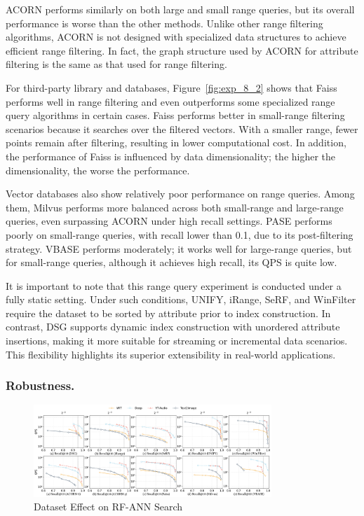 \documentclass[sigconf, nonacm]{acmart}
\begin{document}
	ACORN performs similarly on both large and small range queries, but its overall performance is worse than the other methods. Unlike other range filtering algorithms, ACORN is not designed with specialized data structures  to achieve efficient range filtering. In fact, the graph structure used by ACORN for attribute filtering is the same as that used for range filtering.
	
	For third-party library and databases, Figure~\ref{fig:exp_8_2} shows that Faiss performs well in range filtering and even outperforms some specialized range query algorithms in certain cases. 
	Faiss performs better in small-range filtering scenarios because it searches over the filtered vectors. With a smaller range, fewer points remain after filtering, resulting in lower computational cost. In addition, the performance of Faiss is influenced by data dimensionality; the higher the dimensionality, the worse the performance.
	
	Vector databases also show relatively poor performance on range queries. Among them, Milvus performs more balanced across both small-range and large-range queries, even surpassing ACORN under high recall settings. PASE performs poorly on small-range queries, with recall lower than 0.1, due to its post-filtering strategy. 
	VBASE performs moderately; it works well for large-range queries, but for small-range queries, although it achieves high recall, its QPS is quite  low.
	
	
	
	It is important to note that this range query experiment is conducted under a fully static setting. Under such conditions, UNIFY, iRange, SeRF, and WinFilter require the dataset to be sorted by attribute prior to index construction. In contrast, DSG  supports dynamic index construction with unordered attribute insertions, making it more suitable for streaming or incremental data scenarios. This flexibility highlights its superior extensibility in real-world applications.
	\subsubsection{Robustness.}
	
	
	\begin{figure}[htbp]
		\centering
		\includegraphics[width=0.80\textwidth]{figures/exp/exp_8_3.pdf}
		\caption{Dataset Effect on RF-ANN Search}
		\label{fig:exp_8_3}
	\end{figure}
	
\end{document}
